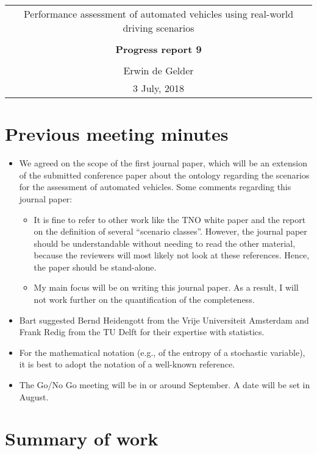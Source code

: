 \documentclass[10pt,final,a4paper,oneside,onecolumn]{article}
\newcommand{\progressreportnumber}{9}
\renewcommand{\author}{Erwin de Gelder}
\renewcommand{\date}{3 July, 2018}
\renewcommand{\title}{Performance assessment of automated vehicles using real-world driving scenarios}
\begin{document}
	
\begin{center}
	\begin{tabular}{c}
		\title \\ \\
		\textbf{\huge Progress report \progressreportnumber} \\ \\
		\author \\ 
		\date
	\end{tabular}
\end{center}

\section{Previous meeting minutes}

\begin{itemize}
	\item We agreed on the scope of the first journal paper, which will be an extension of the submitted conference paper about the ontology regarding the scenarios for the assessment of automated vehicles. Some comments regarding this journal paper:
	\begin{itemize}
		\item It is fine to refer to other work like the TNO white paper and the report on the definition of several ``scenario classes''. However, the journal paper should be understandable without needing to read the other material, because the reviewers will most likely not look at these references. Hence, the paper should be stand-alone.
		\item My main focus will be on writing this journal paper. As a result, I will not work further on the quantification of the completeness.
	\end{itemize}
	\item Bart suggested Bernd Heidengott from the Vrije Universiteit Amsterdam and Frank Redig from the TU Delft for their expertise with statistics.
	\item For the mathematical notation (e.g., of the entropy of a stochastic variable), it is best to adopt the notation of a well-known reference.
	\item The Go/No Go meeting will be in or around September. A date will be set in August.
\end{itemize}

\section{Summary of work}
\end{document}
